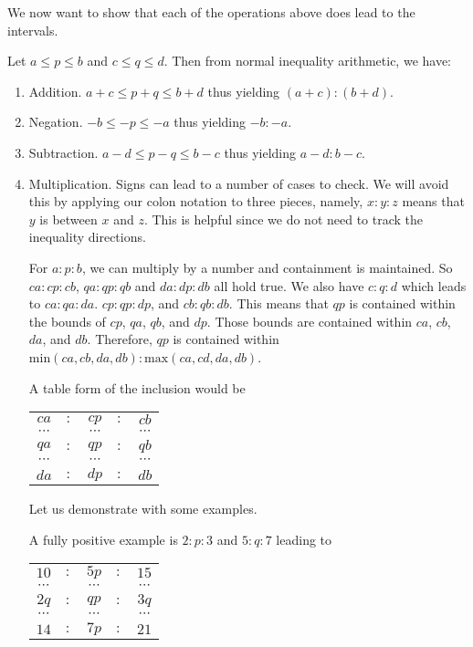 \documentclass[12pt]{article}
\theoremstyle{remark}
\begin{document}
We now want to show that each of the operations above does lead to the intervals. 

Let $a \leq p \leq b$ and $c\leq  q \leq  d$. Then from normal inequality arithmetic, we have: 

\begin{enumerate}
    \item Addition.   $a +c \leq  p + q \leq  b +d$ thus yielding $(a+c):(b+d)$.
    \item Negation.  $-b \leq -p \leq -a$ thus yielding $-b:-a$.
    \item Subtraction.  $a - d \leq p-q \leq b -c$  thus yielding $a-d:b-c$.
    \item Multiplication. Signs can lead to a number of cases to check. We will avoid this by  applying our colon notation to three pieces, namely,  $x:y:z$ means that $y$ is between $x$ and $z$. This is helpful since we do not need to track the inequality directions. 
    
    For $a:p:b$, we can multiply by a number and containment is maintained. So $ca:cp:cb$, $qa: qp: qb$ and $da:dp:db$ all hold true. We also have $c:q:d$ which leads to $ca:qa:da$. $cp:qp:dp$, and $cb:qb:db$. This means that $qp$ is contained within the bounds of $cp$, $qa$, $qb$, and $dp$. Those bounds are contained within $ca$, $cb$, $da$, and $db$. Therefore, $qp$ is contained within $\mathrm{min}(ca, cb, da, db):\mathrm{max}(ca, cd, da, db)$. 
    
    A table form of the inclusion would be 
    
    \begin{tabular}{ccccc}
        $ca$ &$:$& $cp$ &$:$& $cb$ \\
        $\cdots$ & & $\cdots$ & & $\cdots$ \\
        $qa$ &$:$& $qp$ &$:$& $qb$\\
        $\cdots$ & & $\cdots$ & & $\cdots$ \\
         $da$ &$:$& $dp$&$:$& $db$
    \end{tabular}
    
    Let us demonstrate with some examples. 
    
    A fully positive example is $2:p:3$ and $5:q:7$ leading to 
    
     \begin{tabular}{ccccc}
        $10$ &$:$& $5p$ &$:$& $15$ \\
        $\cdots$ & & $\cdots$ & & $\cdots$ \\
        $2q$ &$:$& $qp$ &$:$& $3q$\\
        $\cdots$ & & $\cdots$ & & $\cdots$ \\
         $14$ &$:$& $7p$&$:$& $21$
    \end{tabular}
    

\end{enumerate}
\end{document}
